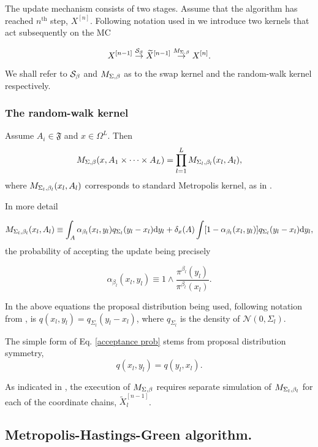 The update mechanism consists of two stages. Assume that the algorithm has reached $n^\text{th}$ step, $X^{[n]}$. Following notation used in \citet*{BłażejMiasojedow} we introduce two kernels that act subsequently on the MC

$$X^{[n-1]} \overset{\mathcal{S}_{\beta}}{\rightarrow} \widetilde{X}^{[n-1]} \overset{M_{\Sigma,\beta}}{\rightarrow} X^{[n]}.$$

We shall refer to $\mathcal{S}_{\beta}$ and $M_{\Sigma,\beta}$ as to the swap kernel and the random-walk kernel respectively.



	\subsubsection*{The random-walk kernel}
	
Assume $A_i \in \mathfrak{F}$ and $x \in \Omega^L$. Then $$M_{\Sigma,\beta} (x, A_1 \times \dots \times A_L) = \prod_{l=1}^L M_{\Sigma_{l},\beta_{l}}(x_l, A_l),$$
where $M_{\Sigma_{l},\beta_{l}}(x_l, A_l)$ corresponds to standard Metropolis kernel, as in \citet*{CharlesJ.Geyer}. 

In more detail 

$$M_{\Sigma_{l},\beta_{l}}(x_l, A_l) \equiv \int_A \alpha_{\beta_l} (x_l, y_l) q_{\Sigma_l} (y_l - x_l) \mathrm{d }y_l + \delta_x (A) \int [1 - \alpha_{\beta_l} (x_l, y_l)] q_{\Sigma_l} (y_l - x_l) \mathrm{d }y_l ,$$
the probability of accepting the update being precisely 

\begin{equation}\label{acceptance prob}
	\alpha_{\beta_l} (x_l, y_l)  \equiv 1 \wedge \frac{\pi^{\beta_l}(y_l)}{\pi^{\beta_l}(x_l)}.
\end{equation}


In the above equations the proposal distribution being used, following notation from \cite{CharlesJ.Geyer}, is $q(x_l,y_l) = q_{\Sigma_l} (y_l - x_l)$, where $q_{\Sigma_l}$ is the density of $\mathcal{N}(0, \Sigma_l)$. 

The simple form of Eq. \ref{acceptance prob} stems from proposal distribution symmetry, $$q(x_l,y_l) = q(y_l,x_l).$$

As indicated in \cite{BłażejMiasojedow}, the execution of $M_{\Sigma,\beta}$ requires separate simulation of $M_{\Sigma_{l},\beta_{l}}$ for each of the coordinate chains,  $\widetilde{X}^{[n-1]}_l$.


	\subsection*{Metropolis-Hastings-Green algorithm.}

